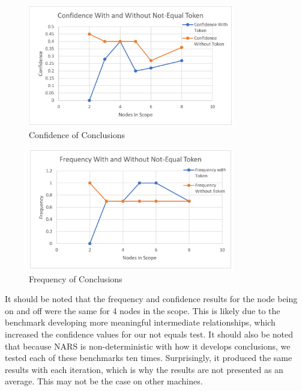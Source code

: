\documentclass[conference]{IEEEtran}
\begin{document}
\begin{figure}[ht!]
\centering
\includegraphics[width=90mm]{Confidence.png}
\caption{Confidence of Conclusions \label{overflow}}
\end{figure}	

\begin{figure}[ht!]
\centering
\includegraphics[width=90mm]{Frequency.png}
\caption{Frequency of Conclusions \label{overflow}}
\end{figure}	
	
	 It should be noted that the frequency and confidence results for the node being on and off were the same for 4 nodes in the scope. This is likely due to the benchmark developing more meaningful intermediate relationships, which increased the confidence values for our not equals test. It should also be noted that because NARS is non-deterministic with how it develops conclusions, we tested each of these benchmarks ten times. Surprisingly, it produced the same results with each iteration, which is why the results are not presented as an average. This may not be the case on other machines.
\end{document}
